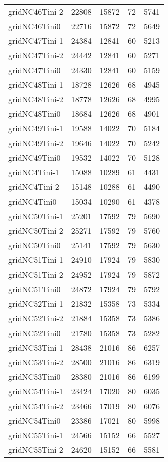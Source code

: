 \begin{longtable}{lrrrr}
gridNC46Tini-2 & 22808 & 15872 & 72 & 5741 \\
gridNC46Tini0 & 22716 & 15872 & 72 & 5649 \\
gridNC47Tini-1 & 24384 & 12841 & 60 & 5213 \\
gridNC47Tini-2 & 24442 & 12841 & 60 & 5271 \\
gridNC47Tini0 & 24330 & 12841 & 60 & 5159 \\
gridNC48Tini-1 & 18728 & 12626 & 68 & 4945 \\
gridNC48Tini-2 & 18778 & 12626 & 68 & 4995 \\
gridNC48Tini0 & 18684 & 12626 & 68 & 4901 \\
gridNC49Tini-1 & 19588 & 14022 & 70 & 5184 \\
gridNC49Tini-2 & 19646 & 14022 & 70 & 5242 \\
gridNC49Tini0 & 19532 & 14022 & 70 & 5128 \\
gridNC4Tini-1 & 15088 & 10289 & 61 & 4431 \\
gridNC4Tini-2 & 15148 & 10288 & 61 & 4490 \\
gridNC4Tini0 & 15034 & 10290 & 61 & 4378 \\
gridNC50Tini-1 & 25201 & 17592 & 79 & 5690 \\
gridNC50Tini-2 & 25271 & 17592 & 79 & 5760 \\
gridNC50Tini0 & 25141 & 17592 & 79 & 5630 \\
gridNC51Tini-1 & 24910 & 17924 & 79 & 5830 \\
gridNC51Tini-2 & 24952 & 17924 & 79 & 5872 \\
gridNC51Tini0 & 24872 & 17924 & 79 & 5792 \\
gridNC52Tini-1 & 21832 & 15358 & 73 & 5334 \\
gridNC52Tini-2 & 21884 & 15358 & 73 & 5386 \\
gridNC52Tini0 & 21780 & 15358 & 73 & 5282 \\
gridNC53Tini-1 & 28438 & 21016 & 86 & 6257 \\
gridNC53Tini-2 & 28500 & 21016 & 86 & 6319 \\
gridNC53Tini0 & 28380 & 21016 & 86 & 6199 \\
gridNC54Tini-1 & 23424 & 17020 & 80 & 6035 \\
gridNC54Tini-2 & 23466 & 17019 & 80 & 6076 \\
gridNC54Tini0 & 23386 & 17021 & 80 & 5998 \\
gridNC55Tini-1 & 24566 & 15152 & 66 & 5527 \\
gridNC55Tini-2 & 24620 & 15152 & 66 & 5581 \\

\end{longtable}

